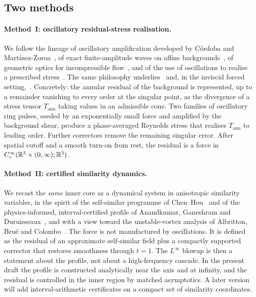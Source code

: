 \subsection{Two methods}
\label{sec:intro-methods}

\paragraph{Method~I: oscillatory residual-stress realisation.}
We follow the lineage of oscillatory amplification developed by {C}{\'o}rdoba and {M}art{\'i}nez-{Z}oroa~\cite{cmz2023,cmz2024ipm,cmzzheng}, of exact finite-amplitude waves on affine backgrounds~\cite{craikcriminale1986}, of geometric optics for incompressible flow~\cite{lifschitz1991,friedlandervishik1991}, and of the use of oscillations to realise a prescribed stress~\cite{daneriszekelyhidi2017}. The same philosophy underlies~\cite{openai2026ns} and, in the inviscid forced setting,~\cite{alpoegbuckmaster2026}. Concretely: the annular residual of the background is represented, up to a remainder vanishing to every order at the singular point, as the divergence of a stress tensor $T_{\mathrm{ann}}$ taking values in an admissible cone. Two families of oscillatory ring pulses, seeded by an exponentially small force and amplified by the background shear, produce a phase-averaged {R}eynolds stress that realises $T_{\mathrm{ann}}$ to leading order. Further correctors remove the remaining singular error. After spatial cutoff and a smooth turn-on from rest, the residual is a force in $C_c^\infty(\mathbb{R}^3\times(0,\infty);\mathbb{R}^3)$.

\paragraph{Method~II: certified similarity dynamics.}
We recast the \emph{same} inner core as a dynamical system in anisotropic similarity variables, in the spirit of the self-similar programme of {C}hen--{H}ou~\cite{chenhou2022} and of the physics-informed, interval-certified profile of {A}nandkumar, {G}aneshram and {D}uruisseaux~\cite{anandkumar2026}, and with a view toward the unstable-vortex analysis of {A}lbritton, {B}ru{\'e} and {C}olombo~\cite{abc2022}. The force is not manufactured by oscillations. It is defined as the residual of an approximate self-similar field plus a compactly supported corrector that restores smoothness through $t=1$. The $L^\infty$ blowup is then a statement about the profile, not about a high-frequency cascade. In the present draft the profile is constructed analytically near the axis and at infinity, and the residual is controlled in the inner region by matched asymptotics. A later version will add interval-arithmetic certificates on a compact set of similarity coordinates.

